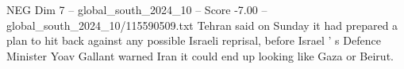 \begin{textsample}{NEG Dim 7 – global\_south\_2024\_10 – Score -7.00 – global\_south\_2024\_10/115590509.txt}
Tehran said on Sunday it had prepared a plan to hit back against any possible Israeli reprisal, before Israel ' s Defence Minister Yoav Gallant warned Iran it could end up looking like Gaza or Beirut.

\end{textsample}
